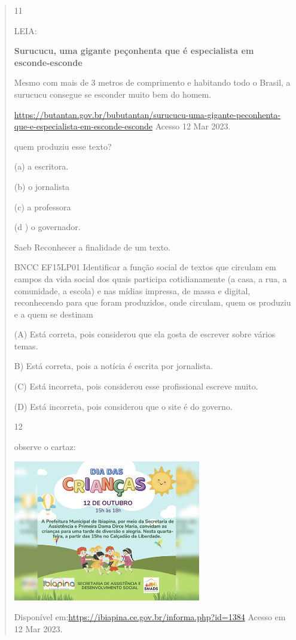 {{{{\begin{verse}
{{\begin{escolha}
{{{{{\num{11}

LEIA:

\textbf{Surucucu, uma gigante peçonhenta que é especialista em
esconde-esconde}

Mesmo com mais de 3 metros de comprimento e habitando todo o Brasil, a
surucucu consegue se esconder muito bem do homem.

\url{https://butantan.gov.br/bubutantan/surucucu-uma-gigante-peconhenta-que-e-especialista-em-esconde-esconde}
Acesso 12 Mar 2023.

quem produziu esse texto?

(a) a escritora.

(b) o jornalista

(c) a professora

(d ) o governador.

Saeb Reconhecer a finalidade de um texto.

BNCC EF15LP01 Identificar a função social de textos que circulam em
campos da vida social dos quais participa cotidianamente (a casa, a rua,
a comunidade, a escola) e nas mídias impressa, de massa e digital,
reconhecendo para que foram produzidos, onde circulam, quem os produziu
e a quem se destinam

(A) Está correta, pois considerou que ela gosta de escrever sobre vários
temas.

B) Está correta, pois a notícia é escrita por jornalista.

(C) Está incorreta, pois considerou esse profissional escreve muito.

(D) Está incorreta, pois considerou que o site é do governo.

\num{12}

observe o cartaz:

\includegraphics[width=3.22436in,height=2.42060in]{media/image181.jpeg}

Disponível em:\url{https://ibiapina.ce.gov.br/informa.php?id=1384}
Acesso em 12 Mar 2023.

}}}}}
\end{escolha}}}
\end{verse}}}}}

